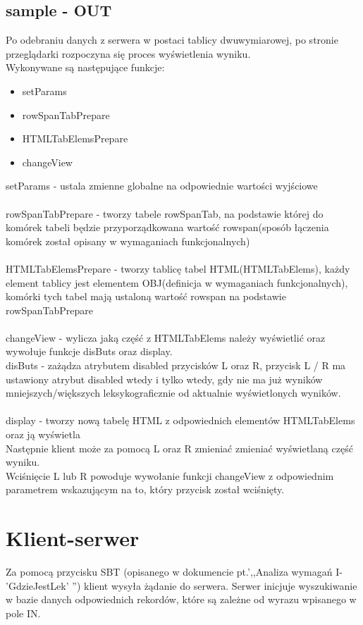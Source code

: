 \documentclass[10pt, a4paper]{article}
\begin{document}
\subsection{sample - OUT}
Po odebraniu danych z serwera w postaci tablicy dwuwymiarowej, po stronie przeglądarki rozpoczyna się proces wyświetlenia wyniku.\\
Wykonywane są następujące funkcje:
\begin{itemize}
\item setParams
\item rowSpanTabPrepare
\item HTMLTabElemsPrepare
\item changeView
\end{itemize}
setParams - ustala zmienne globalne na odpowiednie wartości wyjściowe \\ \\
rowSpanTabPrepare - tworzy tabele rowSpanTab, na podstawie której do komórek tabeli będzie przyporządkowana wartość rowspan(sposób łączenia komórek został opisany w wymaganiach funkcjonalnych) \\ \\
HTMLTabElemsPrepare - tworzy tablicę tabel HTML(HTMLTabElems), każdy element tablicy jest elementem OBJ(definicja w wymaganiach funkcjonalnych), komórki tych tabel mają ustaloną wartość rowspan na podstawie rowSpanTabPrepare \\ \\
changeView - wylicza jaką część z HTMLTabElems należy wyświetlić oraz wywołuje funkcje disButs oraz display.\\
disButs - zażądza atrybutem disabled przycisków L oraz R,
przycisk L / R ma ustawiony atrybut disabled wtedy i tylko wtedy, gdy nie ma już wyników mniejszych/większych leksykograficznie od aktualnie wyświetlonych wyników. \\ \\
display - tworzy nową tabelę HTML z odpowiednich elementów HTMLTabElems oraz ją wyświetla \\
Następnie klient może za pomocą L oraz R zmieniać zmieniać 
wyświetlaną część wyniku. \\
Wciśnięcie L lub R powoduje wywołanie funkcji changeView z odpowiednim parametrem wskazującym na to, który przycisk został wciśnięty.
\section{Klient-serwer}
Za pomocą przycisku SBT (opisanego w dokumencie pt.',,Analiza wymagań I- 'GdzieJestLek' '') klient wysyła żądanie do serwera.
Serwer inicjuje wyszukiwanie w bazie danych odpowiednich rekordów, które są zależne od wyrazu wpisanego w pole IN.
\end{document}
